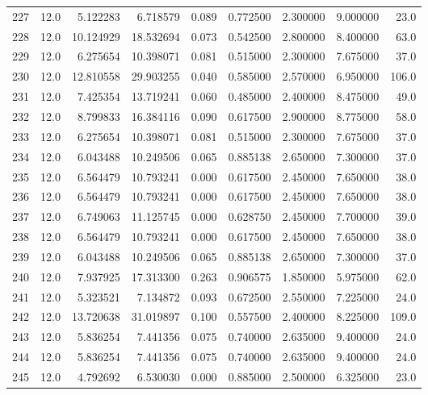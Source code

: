 \begin{tabular}{lrrrrrrrr}
227  &   12.0 &   5.122283 &   6.718579 &  0.089 &  0.772500 &  2.300000 &   9.000000 &   23.0 \\
228  &   12.0 &  10.124929 &  18.532694 &  0.073 &  0.542500 &  2.800000 &   8.400000 &   63.0 \\
229  &   12.0 &   6.275654 &  10.398071 &  0.081 &  0.515000 &  2.300000 &   7.675000 &   37.0 \\
230  &   12.0 &  12.810558 &  29.903255 &  0.040 &  0.585000 &  2.570000 &   6.950000 &  106.0 \\
231  &   12.0 &   7.425354 &  13.719241 &  0.060 &  0.485000 &  2.400000 &   8.475000 &   49.0 \\
232  &   12.0 &   8.799833 &  16.384116 &  0.090 &  0.617500 &  2.900000 &   8.775000 &   58.0 \\
233  &   12.0 &   6.275654 &  10.398071 &  0.081 &  0.515000 &  2.300000 &   7.675000 &   37.0 \\
234  &   12.0 &   6.043488 &  10.249506 &  0.065 &  0.885138 &  2.650000 &   7.300000 &   37.0 \\
235  &   12.0 &   6.564479 &  10.793241 &  0.000 &  0.617500 &  2.450000 &   7.650000 &   38.0 \\
236  &   12.0 &   6.564479 &  10.793241 &  0.000 &  0.617500 &  2.450000 &   7.650000 &   38.0 \\
237  &   12.0 &   6.749063 &  11.125745 &  0.000 &  0.628750 &  2.450000 &   7.700000 &   39.0 \\
238  &   12.0 &   6.564479 &  10.793241 &  0.000 &  0.617500 &  2.450000 &   7.650000 &   38.0 \\
239  &   12.0 &   6.043488 &  10.249506 &  0.065 &  0.885138 &  2.650000 &   7.300000 &   37.0 \\
240  &   12.0 &   7.937925 &  17.313300 &  0.263 &  0.906575 &  1.850000 &   5.975000 &   62.0 \\
241  &   12.0 &   5.323521 &   7.134872 &  0.093 &  0.672500 &  2.550000 &   7.225000 &   24.0 \\
242  &   12.0 &  13.720638 &  31.019897 &  0.100 &  0.557500 &  2.400000 &   8.225000 &  109.0 \\
243  &   12.0 &   5.836254 &   7.441356 &  0.075 &  0.740000 &  2.635000 &   9.400000 &   24.0 \\
244  &   12.0 &   5.836254 &   7.441356 &  0.075 &  0.740000 &  2.635000 &   9.400000 &   24.0 \\
245  &   12.0 &   4.792692 &   6.530030 &  0.000 &  0.885000 &  2.500000 &   6.325000 &   23.0 \\

\end{tabular}
